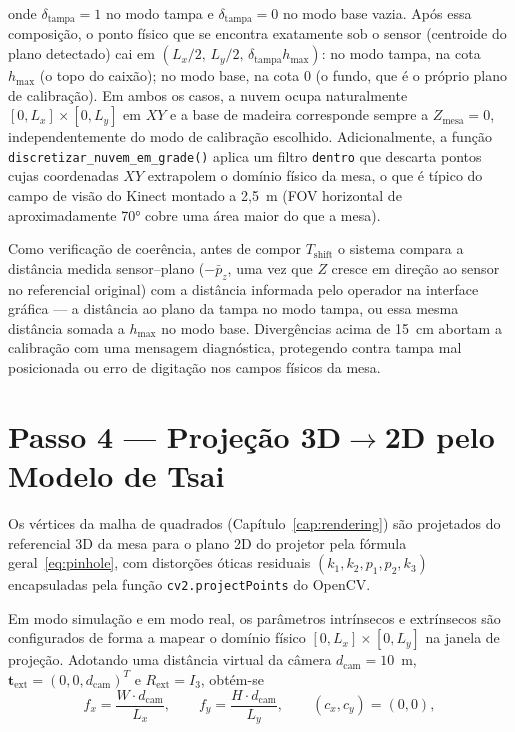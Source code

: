 \noindent onde $\delta_{\text{tampa}} = 1$ no modo tampa e
$\delta_{\text{tampa}} = 0$ no modo base vazia. Após essa composição, o
ponto físico que se encontra exatamente sob o sensor (centroide do
plano detectado) cai em $(L_x/2,\, L_y/2,\, \delta_{\text{tampa}}
h_{\max})$: no modo tampa, na cota $h_{\max}$ (o topo do caixão); no
modo base, na cota $0$ (o fundo, que é o próprio plano de
calibração). Em ambos os casos, a nuvem ocupa naturalmente $[0, L_x]
\times [0, L_y]$ em $XY$ e a base de madeira corresponde sempre a
$Z_{\text{mesa}} = 0$, independentemente do modo de calibração
escolhido. Adicionalmente, a função \texttt{discretizar\_nuvem\_em\_grade()}
aplica um filtro \texttt{dentro} que descarta pontos cujas
coordenadas $XY$ extrapolem o domínio físico da mesa, o que é típico do
campo de visão do Kinect montado a 2,5~m (FOV horizontal de
aproximadamente 70° cobre uma área maior do que a mesa).

Como verificação de coerência, antes de compor $T_{\text{shift}}$
o sistema compara a distância medida sensor–plano ($-\bar{p}_z$, uma
vez que $Z$ cresce em direção ao sensor no referencial original) com a
distância informada pelo operador na interface gráfica — a distância ao
plano da tampa no modo tampa, ou essa mesma distância somada a
$h_{\max}$ no modo base. Divergências acima de 15~cm abortam a
calibração com uma mensagem diagnóstica, protegendo contra tampa mal
posicionada ou erro de digitação nos campos físicos da mesa.

\section{Passo 4 — Projeção 3D$\to$2D pelo Modelo de Tsai}
\label{sec:passo4}

Os vértices da malha de quadrados (Capítulo~\ref{cap:rendering}) são
projetados do referencial 3D da mesa para o plano 2D do projetor pela
fórmula geral~\eqref{eq:pinhole}, com distorções óticas residuais
$(k_1, k_2, p_1, p_2, k_3)$ encapsuladas pela função
\texttt{cv2.projectPoints} do OpenCV.

Em modo simulação e em modo real, os parâmetros
intrínsecos e extrínsecos são configurados de forma a mapear o domínio
físico $[0, L_x] \times [0, L_y]$ na janela de projeção. Adotando uma
distância virtual da câmera $d_{\text{cam}} = 10$~m, $\mathbf{t}_{\text{ext}} =
(0, 0, d_{\text{cam}})^{T}$ e $R_{\text{ext}} = I_3$, obtém-se
\begin{equation}
\label{eq:fxfy-virtual}
f_x = \frac{W \cdot d_{\text{cam}}}{L_x}, \qquad
f_y = \frac{H \cdot d_{\text{cam}}}{L_y},
\qquad (c_x, c_y) = (0, 0),
\end{equation}

